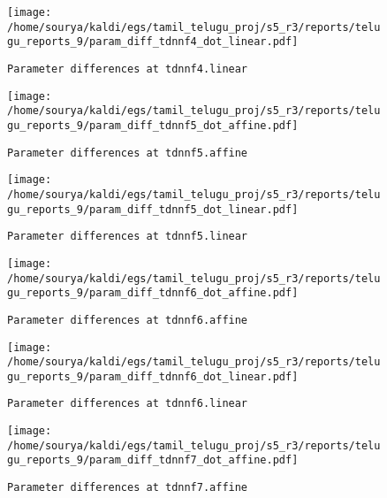 \documentclass[prl,10pt,twocolumn]{revtex4}
\begin{document}
\newpage
\begin{figure}[h]
  \begin{center}
    \caption{\texttt{Parameter differences at tdnnf4.linear}}
    \texttt{[image: /home/sourya/kaldi/egs/tamil\_telugu\_proj/s5\_r3/reports/telugu\_reports\_9/param\_diff\_tdnnf4\_dot\_linear.pdf]}
  \end{center}
\end{figure}
\clearpage


\newpage
\begin{figure}[h]
  \begin{center}
    \caption{\texttt{Parameter differences at tdnnf5.affine}}
    \texttt{[image: /home/sourya/kaldi/egs/tamil\_telugu\_proj/s5\_r3/reports/telugu\_reports\_9/param\_diff\_tdnnf5\_dot\_affine.pdf]}
  \end{center}
\end{figure}
\clearpage


\newpage
\begin{figure}[h]
  \begin{center}
    \caption{\texttt{Parameter differences at tdnnf5.linear}}
    \texttt{[image: /home/sourya/kaldi/egs/tamil\_telugu\_proj/s5\_r3/reports/telugu\_reports\_9/param\_diff\_tdnnf5\_dot\_linear.pdf]}
  \end{center}
\end{figure}
\clearpage


\newpage
\begin{figure}[h]
  \begin{center}
    \caption{\texttt{Parameter differences at tdnnf6.affine}}
    \texttt{[image: /home/sourya/kaldi/egs/tamil\_telugu\_proj/s5\_r3/reports/telugu\_reports\_9/param\_diff\_tdnnf6\_dot\_affine.pdf]}
  \end{center}
\end{figure}
\clearpage


\newpage
\begin{figure}[h]
  \begin{center}
    \caption{\texttt{Parameter differences at tdnnf6.linear}}
    \texttt{[image: /home/sourya/kaldi/egs/tamil\_telugu\_proj/s5\_r3/reports/telugu\_reports\_9/param\_diff\_tdnnf6\_dot\_linear.pdf]}
  \end{center}
\end{figure}
\clearpage


\newpage
\begin{figure}[h]
  \begin{center}
    \caption{\texttt{Parameter differences at tdnnf7.affine}}
    \texttt{[image: /home/sourya/kaldi/egs/tamil\_telugu\_proj/s5\_r3/reports/telugu\_reports\_9/param\_diff\_tdnnf7\_dot\_affine.pdf]}
  \end{center}
\end{figure}
\clearpage
\end{document}
